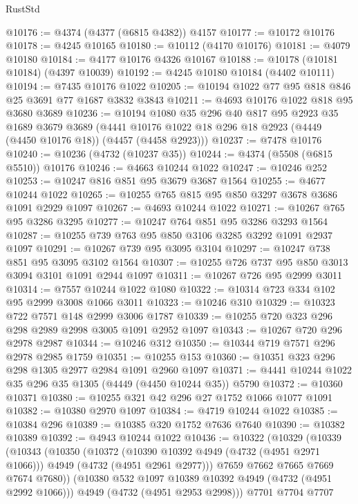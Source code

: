 \begin{lexlean}{RustStd}
\begin{coremodule}
@10176 := @4374 (@4377 (@6815 @4382)) @4157
@10177 := @10172 @10176
@10178 := @4245 @10165
@10180 := @10112 (@4170 @10176)
@10181 := @4079 @10180
@10184 := @4177 @10176 @4326 @10167
@10188 := @10178 (@10181 @10184) (@4397 @10039)
@10192 := @4245 @10180 @10184 (@4402 @10111)
@10194 := @7435 @10176 @1022
@10205 := @10194 @1022 @77 @95 @818 @846 @25 @3691 @77 @1687 @3832 @3843
@10211 := @4693 @10176 @1022 @818 @95 @3680 @3689
@10236 := @10194
    @1080
    @35
    @296
    @40
    @817
    @95
    @2923
    @35
    @1689
    @3679
    @3689
    (@4441 @10176 @1022 @18 @296 @18 @2923 (@4449 (@4450 @10176 @18)) (@4457 (@4458 @2923)))
@10237 := @7478 @10176
@10240 := @10236 (@4732 (@10237 @35))
@10244 := @4374 (@5508 (@6815 @5510)) @10176
@10246 := @4663 @10244 @1022
@10247 := @10246 @252
@10253 := @10247 @816 @851 @95 @3679 @3687 @1564
@10255 := @4677 @10244 @1022
@10265 := @10255 @765 @815 @95 @850 @3297 @3678 @3686 @1091 @2929 @1097
@10267 := @4693 @10244 @1022
@10271 := @10267 @765 @95 @3286 @3295
@10277 := @10247 @764 @851 @95 @3286 @3293 @1564
@10287 := @10255 @739 @763 @95 @850 @3106 @3285 @3292 @1091 @2937 @1097
@10291 := @10267 @739 @95 @3095 @3104
@10297 := @10247 @738 @851 @95 @3095 @3102 @1564
@10307 := @10255 @726 @737 @95 @850 @3013 @3094 @3101 @1091 @2944 @1097
@10311 := @10267 @726 @95 @2999 @3011
@10314 := @7557 @10244 @1022 @1080
@10322 := @10314 @723 @334 @102 @95 @2999 @3008 @1066 @3011
@10323 := @10246 @310
@10329 := @10323 @722 @7571 @148 @2999 @3006 @1787
@10339 := @10255 @720 @323 @296 @298 @2989 @2998 @3005 @1091 @2952 @1097
@10343 := @10267 @720 @296 @2978 @2987
@10344 := @10246 @312
@10350 := @10344 @719 @7571 @296 @2978 @2985 @1759
@10351 := @10255 @153
@10360 := @10351 @323 @296 @298 @1305 @2977 @2984 @1091 @2960 @1097
@10371 := @4441 @10244 @1022 @35 @296 @35 @1305 (@4449 (@4450 @10244 @35)) @5790
@10372 := @10360 @10371
@10380 := @10255 @321 @42 @296 @27 @1752 @1066 @1077 @1091
@10382 := @10380 @2970 @1097
@10384 := @4719 @10244 @1022
@10385 := @10384 @296
@10389 := @10385 @320 @1752 @7636 @7640
@10390 := @10382 @10389
@10392 := @4943 @10244 @1022
@10436 := @10322
    (@10329
      (@10339
        (@10343
          (@10350
            (@10372
              (@10390 @10392 @4949 (@4732 (@4951 @2971 @1066)))
              @4949
              (@4732 (@4951 @2961 @2977)))
            @7659
            @7662
            @7665
            @7669
            @7674
            @7680))
        (@10380 @532 @1097 @10389 @10392 @4949 (@4732 (@4951 @2992 @1066)))
        @4949
        (@4732 (@4951 @2953 @2998)))
      @7701
      @7704
      @7707

\end{coremodule}
\end{lexlean}
